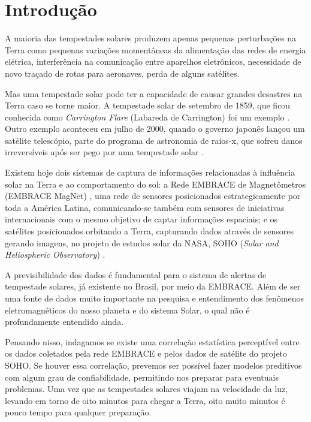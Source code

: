 \documentclass[12pt, consuni, professor]{uftpibic}
\theoremstyle{plain}
\begin{document}
\chapter{Introdução}

A maioria das tempestades solares produzem apenas pequenas perturbações na Terra como pequenas variações momentâneas da alimentação das redes de energia elétrica, interferência na comunicação entre aparelhos eletrônicos, necessidade de novo traçado de rotas para aeronaves, perda de alguns satélites. 

Mas uma tempestade solar pode ter a capacidade de causar grandes desastres na Terra caso se torne maior. A tempestade solar de setembro de 1859, que ficou conhecida como \textit{Carrington Flare} (Labareda de Carrington) foi um exemplo \cite{Carrington2003}. Outro exemplo aconteceu em julho de 2000, quando o governo japonês lançou um satélite telescópio, parte do programa de astronomia de raios-x, que sofreu danos irreversíveis após ser pego por uma tempestade solar \cite{Dennis2000}.

Existem hoje dois sistemas de captura de informações relacionadas à influência solar na Terra e ao comportamento do sol: a Rede EMBRACE de Magnetômetros (EMBRACE MagNet) \cite{Denardini2015,Denardini2016,Denardini2018,Denardini2018b}, uma rede de sensores posicionados estrategicamente por toda a América Latina, comunicando-se também com sensores de iniciativas internacionais com o mesmo objetivo de captar informações espaciais; e os satélites posicionados orbitando a Terra, capturando dados através de sensores gerando imagens, no projeto de estudos solar da NASA, SOHO (\textit{Solar and Heliospheric Observatory}) \cite{Akmal2001}.

A previsibilidade dos dados é fundamental para o sistema de alertas de tempestade solares, já existente no Brasil, por meio da EMBRACE. Além de ser uma fonte de dados muito importante na pesquisa e entendimento dos fenômenos eletromagnéticos do nosso planeta e do sistema Solar, o qual não é profundamente entendido ainda.

Pensando nisso, indagamos se existe uma correlação estatística perceptível entre os dados coletados pela rede EMBRACE e pelos dados de satélite do projeto SOHO. Se houver essa correlação, prevemos ser possível fazer modelos preditivos com algum grau de confiabilidade, permitindo nos preparar para eventuais problemas. Uma vez que as tempestades solares viajam na velocidade da luz, levando em torno de oito minutos para chegar a Terra, oito muito minutos é pouco tempo para qualquer preparação.
\end{document}
